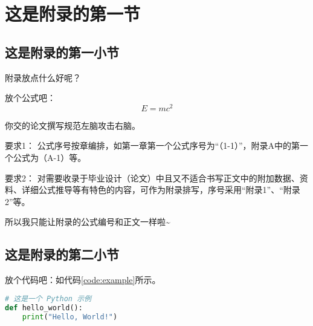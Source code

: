 
\section{这是附录的第一节}

\subsection{这是附录的第一小节}

附录放点什么好呢？

放个公式吧：
\begin{equation}
    E = mc^2
\end{equation}

你交的论文撰写规范左脑攻击右脑。

要求1：
公式序号按章编排，如第一章第一个公式序号为“（1-1）”，附录A中的第一个公式为（A-1）等。

要求2：
对需要收录于毕业设计（论文）中且又不适合书写正文中的附加数据、资料、详细公式推导等有特色的内容，可作为附录排写，序号采用“附录1”、“附录2”等。

所以我只能让附录的公式编号和正文一样啦\~{}

\subsection{这是附录的第二小节}

放个代码吧：如代码\ref{code:example}所示。

\begin{lstlisting}[language=Python, caption=示例代码, label=code:example]
# 这是一个 Python 示例
def hello_world():
    print("Hello, World!")
\end{lstlisting}